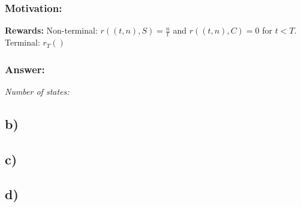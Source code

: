\documentclass{article}
\begin{document}
\subsubsection*{Motivation:}
\textbf{Rewards:} Non-terminal: $r((t,n), S) = \frac{n}{t}$ and $r((t, n), C) = 0$
for $t < T$. \\
Terminal: $r_T ()$




\subsubsection*{Answer:}
\textit{Number of states:}

\subsection*{b)}
\subsection*{c)}
\subsection*{d)}
\end{document}
